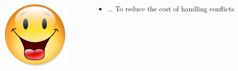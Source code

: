 \documentclass[xcolor={x11names,svgnames},x11names,svgnames]{beamer}
\begin{document}
\begin{frame}[label=idea1]
  \begin{columns}[c]
    \begin{column}{.1\textwidth}
      \vspace{3mm}
      \includegraphics[width=\textwidth]{Content.png}
    \end{column}
    
    \begin{column}{.9\textwidth}
      \begin{itemize}
      \item ... To reduce the cost of handling conflicts
      \end{itemize}
    \end{column}
  \end{columns}  
\end{frame}

\end{document}
